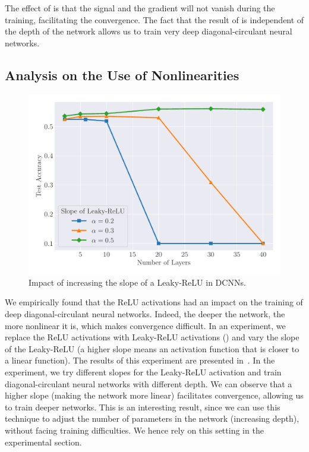 The effect of  is that the signal and the gradient will not vanish during the training, facilitating the convergence.
The fact that the result of  is independent of the depth of the network allows us to train very deep diagonal-circulant neural networks.



\subsection{Analysis on the Use of Nonlinearities}
\label{subsection:ch4-analysis_on_the_use_of_nonlinearities}

\begin{figure}[htb]
  \centering
  \includegraphics[width=\scalefigure\textwidth]{figures/main/ch4-diagonal_circulant/cifar10_leaky_relu.pdf}
  \caption{Impact of increasing the slope of a Leaky-ReLU in DCNNs.}
  \label{figure:ch4-cifar10_leaky_relu}
\end{figure}


We empirically found that the ReLU activations had an impact on the training of deep diagonal-circulant neural networks.
Indeed, the deeper the network, the more nonlinear it is, which makes convergence difficult.
In an experiment, we replace the ReLU activations with Leaky-ReLU activations (\cf {}) and vary the slope of the Leaky-ReLU (a higher slope means an activation function that is closer to a linear function).
The results of this experiment are presented in~.
In the experiment, we try different slopes for the Leaky-ReLU activation and train diagonal-circulant neural networks with different depth.
We can observe that a higher slope (making the network more linear) facilitates convergence, allowing us to train deeper networks.
This is an interesting result, since  we can use this technique to adjust the number of parameters in the network (increasing depth), without facing training difficulties.
We hence rely on this setting in the experimental section. 

